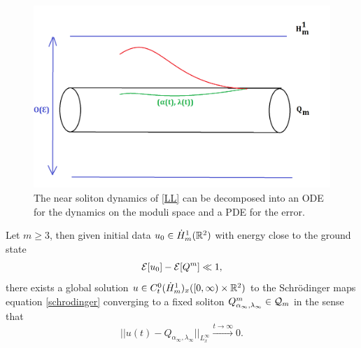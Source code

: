\begin{figure}[h]
	\begin{center}
		\includegraphics[scale=0.25]{graphics/moduli.png}
	\caption{The near soliton dynamics of \eqref{LL} can be decomposed into an ODE for the dynamics on the moduli space and a PDE for the error. }
\end{center}
\end{figure}

\begin{theorem}\label{thm:main}
	Let $m \geq 3$, then given initial data $u_0 \in \dot H^1_m (\mathbb R^2)$ with energy close to the ground state 
		\[
			\mathcal E[u_0] - \mathcal E[Q^m] \ll 1, 
		\]
	there exists a global solution $u \in C^0_t (\dot H^1_m)_x ([0, \infty) \times \mathbb R^2)$ to the Schr\"odinger maps equation \eqref{schrodinger} converging to a fixed soliton $Q^m_{\alpha_\infty, \lambda_\infty} \in \mathcal Q_m$ in the sense that 
		\begin{equation}\label{eq:convergence}
			|| u (t) - Q_{\alpha_\infty, \lambda_\infty}||_{L^\infty_x} \overset{t \to \infty}{\longrightarrow} 0. 
		\end{equation}
\end{theorem}
